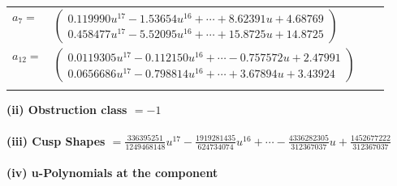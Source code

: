 \documentclass[1p]{elsarticle_modified}
\theoremstyle{definition}
\begin{document}
\begin{tabular}{m{7pt} m{180pt} m{7pt} m{180pt} }
\flushright $a_{7}=$&$\begin{pmatrix}0.119990 u^{17}-1.53654 u^{16}+\cdots+8.62391 u+4.68769\\0.458477 u^{17}-5.52095 u^{16}+\cdots+15.8725 u+14.8725\end{pmatrix}$ \\
\flushright $a_{12}=$&$\begin{pmatrix}0.0119305 u^{17}-0.112150 u^{16}+\cdots-0.757572 u+2.47991\\0.0656686 u^{17}-0.798814 u^{16}+\cdots+3.67894 u+3.43924\end{pmatrix}$\\&\end{tabular}
\flushleft \textbf{(ii) Obstruction class $= -1$}\\~\\
\flushleft \textbf{(iii) Cusp Shapes $= \frac{336395251}{1249468148} u^{17}-\frac{1919281435}{624734074} u^{16}+\cdots-\frac{4336282305}{312367037} u+\frac{1452677222}{312367037}$}\\~\\
\newpage\renewcommand{\arraystretch}{1}
\flushleft \textbf{(iv) u-Polynomials at the component}\newline \\
\end{document}
